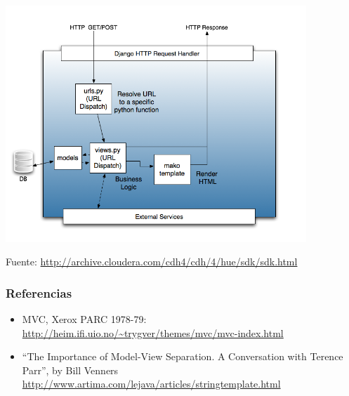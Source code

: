 \begin{frame}

\begin{center}
\includegraphics[width=0.85\textwidth]{figs/mvc-mtv-django}
\end{center}

{\footnotesize
Fuente: \url{http://archive.cloudera.com/cdh4/cdh/4/hue/sdk/sdk.html}
}
\end{frame}



\begin{frame}
\frametitle{Referencias}

\begin{itemize}
\item MVC, Xerox PARC 1978-79: \\
  \url{http://heim.ifi.uio.no/~trygver/themes/mvc/mvc-index.html}
\item ``The Importance of Model-View Separation. A Conversation with Terence Parr'', by Bill Venners \\
  \url{http://www.artima.com/lejava/articles/stringtemplate.html}
\end{itemize}
\end{frame}
